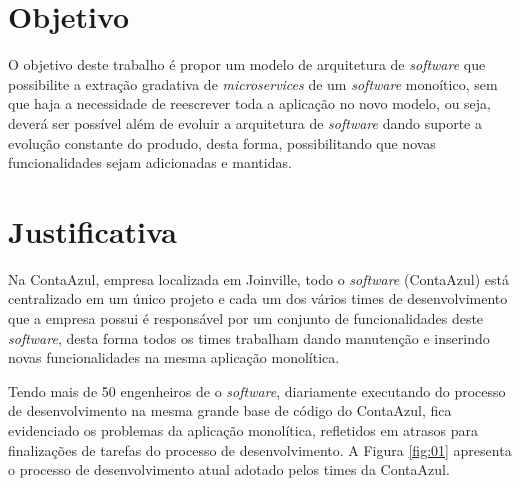 \section{Objetivo}

O objetivo deste trabalho é propor um modelo de arquitetura de \textit{software} que possibilite a extração gradativa de \textit{microservices} de um \textit{software} monoítico, sem que haja a necessidade de reescrever toda a aplicação no novo modelo, ou seja, deverá ser possível além de evoluir a arquitetura de \textit{software} dando suporte a evolução constante do produdo, desta forma, possibilitando que novas funcionalidades sejam adicionadas e mantidas.

\section{Justificativa}

Na ContaAzul, empresa localizada em Joinville, todo o \textit{software} (ContaAzul) está centralizado em um único projeto e cada um dos vários times de desenvolvimento que a empresa possui é responsável por um conjunto de funcionalidades deste \textit{software}, desta forma todos os times trabalham dando manutenção e inserindo novas funcionalidades na mesma aplicação monolítica.

Tendo mais de 50 engenheiros de  o \textit{software}, diariamente executando do processo de desenvolvimento na mesma grande base de código do ContaAzul, fica evidenciado os problemas da aplicação monolítica, refletidos em atrasos para finalizações de tarefas do processo de desenvolvimento. A Figura \ref{fig:01} apresenta o processo de desenvolvimento atual adotado pelos times da ContaAzul.

